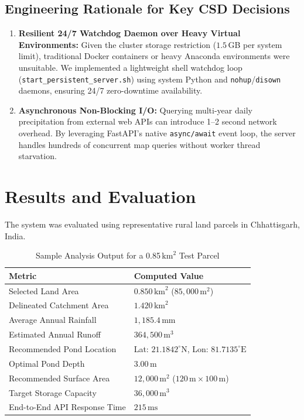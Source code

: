 \documentclass[11pt,a4paper]{article}
\begin{document}
\subsection{Engineering Rationale for Key CSD Decisions}
\begin{enumerate}
    \item \textbf{Resilient 24/7 Watchdog Daemon over Heavy Virtual Environments:} Given the cluster storage restriction ($1.5$\,GB per system limit), traditional Docker containers or heavy Anaconda environments were unsuitable. We implemented a lightweight shell watchdog loop (\texttt{start\_persistent\_server.sh}) using system Python and \texttt{nohup}/\texttt{disown} daemons, ensuring 24/7 zero-downtime availability.
    \item \textbf{Asynchronous Non-Blocking I/O:} Querying multi-year daily precipitation from external web APIs can introduce 1--2 second network overhead. By leveraging FastAPI's native \texttt{async/await} event loop, the server handles hundreds of concurrent map queries without worker thread starvation.
\end{enumerate}

\section{Results and Evaluation}
\label{sec:results}
The system was evaluated using representative rural land parcels in Chhattisgarh, India.

\begin{table}[h]
\centering
\caption{Sample Analysis Output for a 0.85\,$\text{km}^2$ Test Parcel}
\label{tab:eval_results}
\vspace{0.2cm}
\begin{tabular}{ll}
\toprule
\textbf{Metric} & \textbf{Computed Value} \\
\midrule
Selected Land Area & $0.850 \, \text{km}^2$ ($85,000 \, \text{m}^2$) \\
Delineated Catchment Area & $1.420 \, \text{km}^2$ \\
Average Annual Rainfall & $1,185.4 \, \text{mm}$ \\
Estimated Annual Runoff & $364,500 \, \text{m}^3$ \\
Recommended Pond Location & Lat: $21.1842^{\circ}\text{N}$, Lon: $81.7135^{\circ}\text{E}$ \\
Optimal Pond Depth & $3.00 \, \text{m}$ \\
Recommended Surface Area & $12,000 \, \text{m}^2$ ($120\,\text{m} \times 100\,\text{m}$) \\
Target Storage Capacity & $36,000 \, \text{m}^3$ \\
End-to-End API Response Time & $215 \, \text{ms}$ \\
\bottomrule
\end{tabular}
\end{table}
\end{document}
